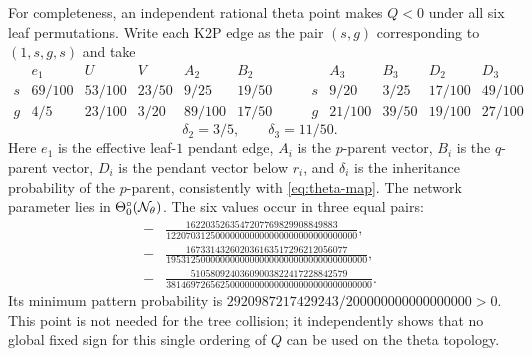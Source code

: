\documentclass[11pt]{article}
\theoremstyle{remark}\newtheorem{remark}[theorem]{Remark}
\begin{document}
For completeness, an independent rational theta point makes $Q<0$ under all six leaf permutations. Write each K2P edge as the pair $(s,g)$ corresponding to $(1,s,g,s)$ and take
\[
\begin{array}{c|ccccc}
 &e_1&U&V&A_2&B_2\\\hline
s&69/100&53/100&23/50&9/25&19/50\\
g&4/5&23/100&3/20&89/100&17/50
\end{array}
\qquad
\begin{array}{c|cccc}
 &A_3&B_3&D_2&D_3\\\hline
s&9/20&3/25&17/100&49/100\\
g&21/100&39/50&19/100&27/100
\end{array}
\]
\[
\delta_2=3/5,\qquad\delta_3=11/50.
\]
Here $e_1$ is the effective leaf-$1$ pendant edge, $A_i$ is the $p$-parent vector, $B_i$ is the $q$-parent vector, $D_i$ is the pendant vector below $r_i$, and $\delta_i$ is the inheritance probability of the $p$-parent, consistently with \eqref{eq:theta-map}. The network parameter lies in $\Theta_0^\circ(\mathcal N_\theta)$. The six values occur in three equal pairs:
\begin{align*}
-&\frac{1622035263547207769829908849883}{122070312500000000000000000000000000000},\\
-&\frac{167331432602036163517296212056077}{19531250000000000000000000000000000000000},\\
-&\frac{51058092403609003822417228842579}{381469726562500000000000000000000000000000}.
\end{align*}
Its minimum pattern probability is $2920987217429243/200000000000000000>0$. This point is not needed for the tree collision; it independently shows that no global fixed sign for this single ordering of $Q$ can be used on the theta topology.
\end{document}
